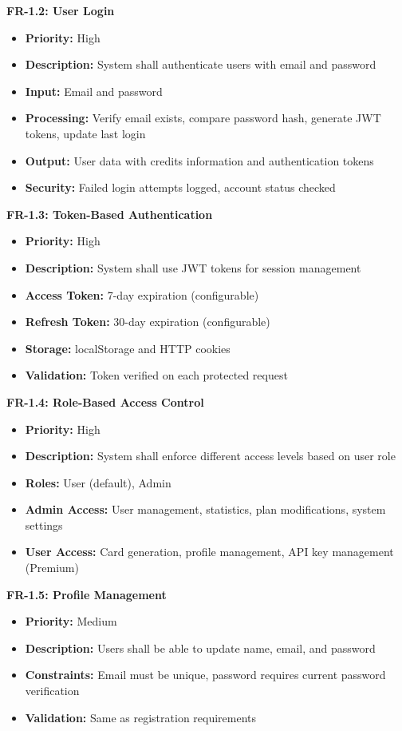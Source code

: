 \documentclass[12pt,a4paper]{article}
\begin{document}
\textbf{FR-1.2: User Login}
\begin{itemize}
    \item \textbf{Priority:} High
    \item \textbf{Description:} System shall authenticate users with email and password
    \item \textbf{Input:} Email and password
    \item \textbf{Processing:} Verify email exists, compare password hash, generate JWT tokens, update last login
    \item \textbf{Output:} User data with credits information and authentication tokens
    \item \textbf{Security:} Failed login attempts logged, account status checked
\end{itemize}

\textbf{FR-1.3: Token-Based Authentication}
\begin{itemize}
    \item \textbf{Priority:} High
    \item \textbf{Description:} System shall use JWT tokens for session management
    \item \textbf{Access Token:} 7-day expiration (configurable)
    \item \textbf{Refresh Token:} 30-day expiration (configurable)
    \item \textbf{Storage:} localStorage and HTTP cookies
    \item \textbf{Validation:} Token verified on each protected request
\end{itemize}

\textbf{FR-1.4: Role-Based Access Control}
\begin{itemize}
    \item \textbf{Priority:} High
    \item \textbf{Description:} System shall enforce different access levels based on user role
    \item \textbf{Roles:} User (default), Admin
    \item \textbf{Admin Access:} User management, statistics, plan modifications, system settings
    \item \textbf{User Access:} Card generation, profile management, API key management (Premium)
\end{itemize}

\textbf{FR-1.5: Profile Management}
\begin{itemize}
    \item \textbf{Priority:} Medium
    \item \textbf{Description:} Users shall be able to update name, email, and password
    \item \textbf{Constraints:} Email must be unique, password requires current password verification
    \item \textbf{Validation:} Same as registration requirements
\end{itemize}
\end{document}
